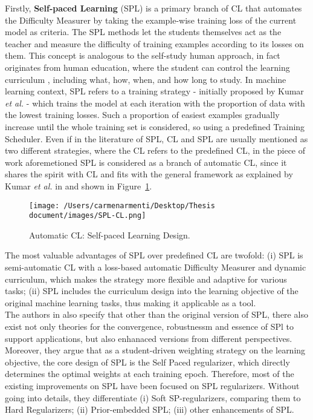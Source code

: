 Firstly, \textbf{Self-paced Learning} (SPL) is a primary branch of CL that automates the Difficulty Measurer
by taking the example-wise training loss of the current model as criteria. The SPL methods let the students themselves
act as the teacher and measure the difficulty of training examples according to its losses on them. 
This concept is analogous to the self-study human approach, in fact
originates from human education, where the student can control the learning curriculum , including what, how, when, and how long 
to study. In machine learning context, SPL refers to a training strategy - initially proposed by Kumar \textit{et al.} \cite{kumar2010self} -
which trains the model at each iteration with the proportion of data with the lowest training losses.
Such a proportion of easiest examples gradually increase until the whole training set is considered, so using a predefined Training Scheduler.
Even if in the literature of SPL, CL and SPL are usually mentioned as two different strategies, where the CL 
refers to the predefined CL, in the piece of work aforemetioned SPL is considered as a branch of automatic CL, since it shares 
the spirit with CL and fits with the general framework as explained by Kumar \textit{et al.} in \cite{kumar2010self} and shown in Figure~\ref{fig:SPL-CL}.
\begin{figure}[h]
    \begin{center}
        \texttt{[image: /Users/carmenarmenti/Desktop/Thesis document/images/SPL-CL.png]}
        \caption{\label{fig:SPL-CL}Automatic CL: Self-paced Learning Design.}
    \end{center}
\end{figure}
The most valuable advantages of SPL over predefined CL are twofold: (i) SPL is semi-automatic CL 
with a loss-based automatic Difficulty Measurer and dynamic curriculum, which makes the strategy more flexible and adaptive for various tasks; (ii) SPL includes the curriculum
design into the learning objective of the original machine learning tasks, thus making it applicable as a tool.\\
The authors in \cite{wang2021survey} also specify that other than the original version of SPL, there also exist not only theories for the 
convergence, robustnessm and essence of SPl to support applications, but also enhanaced versions from different 
perspectives. Moreover, they argue that as a student-driven weighting strategy on the learning objective, the core 
design of SPL is the Self Paced regularizer, which directly determines the optimal weights at each training epoch. Therefore,
most of the existing improvements on SPL have been focused on SPL regularizers. Without going into details, they differentiate (i) Soft SP-regularizers, 
comparing them to Hard Regularizers; (ii) Prior-embedded SPL; (iii) other enhancements of SPL.

